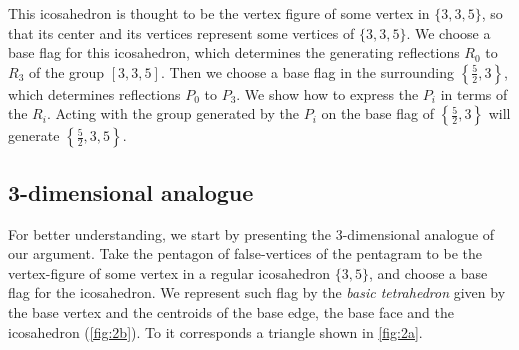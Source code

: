 \documentclass{article}
\theoremstyle{definition}
\begin{document}
	This icosahedron is thought to be the vertex figure of some vertex in $\{3,3,5\}$, so that its center and its vertices represent some vertices of $\{3,3,5\}$. We choose a base flag for this icosahedron, which determines the generating reflections $R_0$ to $R_3$ of the group $[3,3,5]$. Then we choose a base flag in the surrounding $\left\{\frac{5}{2},3\right\}$, which determines reflections $P_0$ to $P_3$. We show how to express the $P_i$ in terms of the $R_i$. Acting with the group generated by the $P_i$ on the base flag of  $\left\{\frac{5}{2},3\right\}$ will generate $\left\{\frac{5}{2},3,5\right\}$.
	
	\subsection{3-dimensional analogue}
	
	For better understanding, we start by presenting the 3-dimensional analogue of our argument. Take the pentagon of false-vertices of the pentagram to be the vertex-figure of some vertex in a regular icosahedron $\{3,5\}$, and choose a base flag for the icosahedron. We represent such flag by the \textit{basic tetrahedron} given by the base vertex and the centroids of the base edge, the base face and the icosahedron (\cref{fig:2b}). To it corresponds a triangle shown in \cref{fig:2a}.
	
\end{document}
